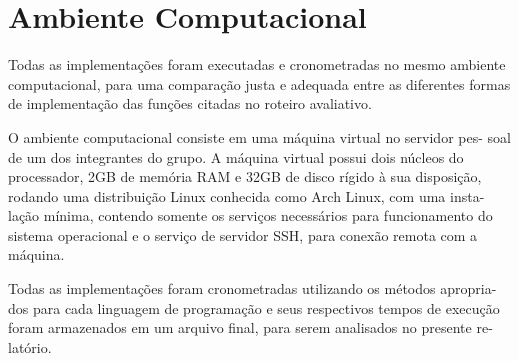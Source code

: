 \section{Ambiente Computacional}

Todas as implementações foram executadas e cronometradas no 
mesmo ambiente computacional, para uma comparação justa e 
adequada entre as diferentes formas de implementação das 
funções citadas no roteiro avaliativo.


O ambiente computacional consiste em uma máquina virtual no servidor pes-
soal de um dos integrantes do grupo. A máquina virtual possui dois núcleos do
processador, 2GB de memória RAM e 32GB de disco rígido à sua disposição,
rodando uma distribuição Linux conhecida como Arch Linux, com uma insta-
lação mínima, contendo somente os serviços necessários para funcionamento do
sistema operacional e o serviço de servidor SSH, para conexão remota com a
máquina.

Todas as implementações foram cronometradas utilizando os métodos apropria-
dos para cada linguagem de programação e seus respectivos tempos de execução
foram armazenados em um arquivo final, para serem analisados no presente re-
latório.

